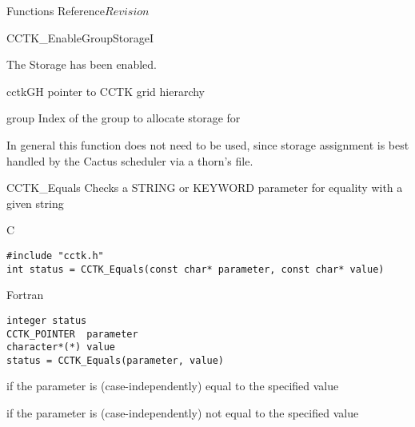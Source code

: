 \begin{cactuspart}{ Functions Reference}{}{$Revision$}
\begin{FunctionDescription}{CCTK\_EnableGroupStorageI}
\begin{ResultSection}
\begin{Result}{0}
The Storage has been enabled.
\end{Result}
\end{ResultSection}

\begin{ParameterSection}
\begin{Parameter}{cctkGH}
pointer to CCTK grid hierarchy
\end{Parameter}
\begin{Parameter}{group}
Index of the group to allocate storage for
\end{Parameter}
\end{ParameterSection}

\begin{Discussion}
In general this function does not need to be used, since storage assignment is best handled by
the Cactus scheduler via a thorn's  file.
\end{Discussion}

\end{FunctionDescription}

\begin{FunctionDescription}{CCTK\_Equals}
\label{CCTK-Equals}
Checks a STRING or KEYWORD parameter for equality with a given string

\begin{SynopsisSection}
\begin{Synopsis}{C}
\begin{verbatim}
#include "cctk.h"
int status = CCTK_Equals(const char* parameter, const char* value)
\end{verbatim}
\end{Synopsis}
\begin{Synopsis}{Fortran}
\begin{verbatim}
integer status
CCTK_POINTER  parameter
character*(*) value
status = CCTK_Equals(parameter, value)
\end{verbatim}
\end{Synopsis}
\end{SynopsisSection}

\begin{ResultSection}
\begin{Result}{1}
if the parameter is (case-independently) equal to the specified value
\end{Result}
\begin{Result}{0}
if the parameter is (case-independently) not equal to the specified value
\end{Result}
\end{ResultSection}


\end{FunctionDescription}
\end{cactuspart}
